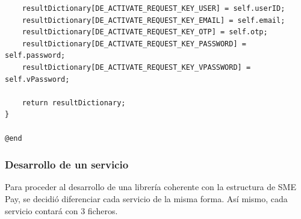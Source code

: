 \documentclass[a4paper, 12pt]{article}
\newenvironment{code}{\captionsetup{type=listing}}{}
\begin{document}
\begin{code}
\begin{verbatim}
    resultDictionary[DE_ACTIVATE_REQUEST_KEY_USER] = self.userID;
    resultDictionary[DE_ACTIVATE_REQUEST_KEY_EMAIL] = self.email;
    resultDictionary[DE_ACTIVATE_REQUEST_KEY_OTP] = self.otp;
    resultDictionary[DE_ACTIVATE_REQUEST_KEY_PASSWORD] = self.password;
    resultDictionary[DE_ACTIVATE_REQUEST_KEY_VPASSWORD] = self.vPassword;

    return resultDictionary;
}

@end

\end{verbatim}
\end{code}
\bigbreak
\subsubsection{Desarrollo de un servicio}
\label{sec-4-2-3}
Para proceder al desarrollo de una librería coherente con la estructura de SME Pay, se decidió diferenciar cada servicio de la misma forma. Así mismo, cada servicio contará con 3 ficheros.
\end{document}
